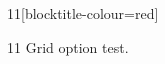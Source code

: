\documentclass[paper=A4]{ropas-poster}
\begin{document}
\begin{postergrid}{1}{1}[blocktitle-colour=red]
\begin{posterblock}{1}{1}
Grid option test.
\end{posterblock}
\end{postergrid}
\end{document}
